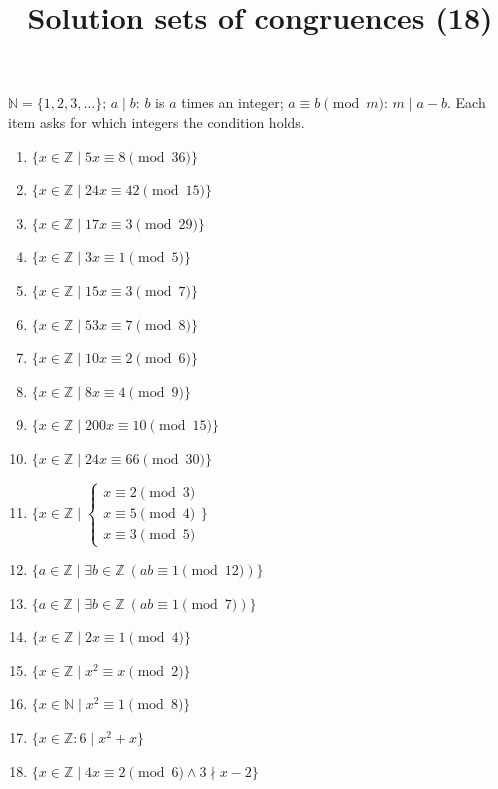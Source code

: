 \documentclass[11pt,a4paper]{article}
\title{Solution sets of congruences (18)}
\author{}
\date{}
\begin{document}
\maketitle
$\mathbb{N} = \{1, 2, 3, \ldots\}$; $a \mid b$: $b$ is $a$ times an integer; $a \equiv b \pmod{m}$: $m \mid a - b$. Each item asks for which integers the condition holds.

\begin{enumerate}
\item $\displaystyle \{x \in \mathbb{Z} \mid 5x \equiv 8 \pmod{36}\}$
\item $\displaystyle \{x \in \mathbb{Z} \mid 24x \equiv 42 \pmod{15}\}$
\item $\displaystyle \{x \in \mathbb{Z} \mid 17x \equiv 3 \pmod{29}\}$
\item $\displaystyle \{x \in \mathbb{Z} \mid 3x \equiv 1 \pmod{5}\}$
\item $\displaystyle \{x \in \mathbb{Z} \mid 15x \equiv 3 \pmod{7}\}$
\item $\displaystyle \{x \in \mathbb{Z} \mid 53x \equiv 7 \pmod{8}\}$
\item $\displaystyle \{x \in \mathbb{Z} \mid 10x \equiv 2 \pmod{6}\}$
\item $\displaystyle \{x \in \mathbb{Z} \mid 8x \equiv 4 \pmod{9}\}$
\item $\displaystyle \{x \in \mathbb{Z} \mid 200x \equiv 10 \pmod{15}\}$
\item $\displaystyle \{x \in \mathbb{Z} \mid 24x \equiv 66 \pmod{30}\}$
\item $\displaystyle \{x \in \mathbb{Z} \mid \begin{cases} x \equiv 2 \pmod{3} \\ x \equiv 5 \pmod{4} \\ x \equiv 3 \pmod{5} \end{cases}\}$
\item $\displaystyle \{a \in \mathbb{Z} \mid \exists b \in \mathbb{Z}\ (ab \equiv 1 \pmod{12})\}$
\item $\displaystyle \{a \in \mathbb{Z} \mid \exists b \in \mathbb{Z}\ (ab \equiv 1 \pmod{7})\}$
\item $\displaystyle \{x \in \mathbb{Z} \mid 2x \equiv 1 \pmod{4}\}$
\item $\displaystyle \{x \in \mathbb{Z} \mid x^{2} \equiv x \pmod{2}\}$
\item $\displaystyle \{x \in \mathbb{N} \mid x^{2} \equiv 1 \pmod{8}\}$
\item $\displaystyle \{x \in \mathbb{Z} : 6 \mid x^{2} + x\}$
\item $\displaystyle \{x \in \mathbb{Z} \mid 4x \equiv 2 \pmod{6} \land 3 \nmid x - 2\}$
\end{enumerate}
\end{document}
